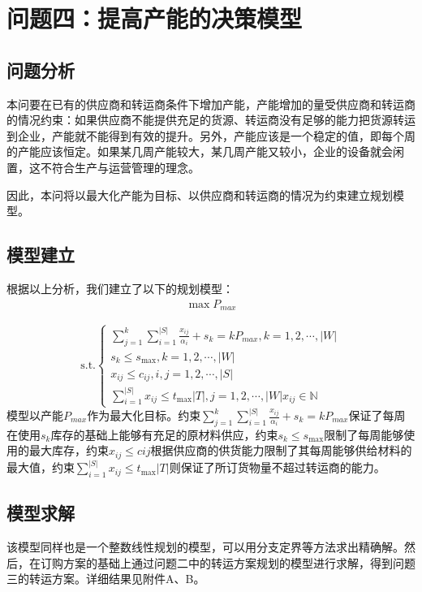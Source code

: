 \documentclass[withoutpreface,bwprint]{cumcmthesis} %
\begin{document}
\section{问题四：提高产能的决策模型}

\subsection{问题分析}

本问要在已有的供应商和转运商条件下增加产能，产能增加的量受供应商和转运商的情况约束：如果供应商不能提供充足的货源、转运商没有足够的能力把货源转运到企业，产能就不能得到有效的提升。另外，产能应该是一个稳定的值，即每个周的产能应该恒定。如果某几周产能较大，某几周产能又较小，企业的设备就会闲置，这不符合生产与运营管理的理念。

因此，本问将以最大化产能为目标、以供应商和转运商的情况为约束建立规划模型。

\subsection{模型建立}
根据以上分析，我们建立了以下的规划模型：
\begin{gather}
    \max P_{max}
\end{gather}

\begin{equation}
    \mathrm{s.t.}
    \begin{cases}
        \sum\limits_{j = 1}^{k}  \sum\limits_{i = 1}^{|S|} \frac{x_{ij}}{\alpha_i}+s_k=kP_{max}, k=1,2,\cdots,|W|\\
        s_k\leq s_{\mathrm{max}}, k=1,2,\cdots,|W|\\
        x_{ij}\leq c_{ij}, i,j = 1,2,\cdots,|S|\\
        \sum\limits_{i = 1}^{|S|} x_{ij} \leq t_{\mathrm{max}}|T|, j = 1,2,\cdots,|W|
        x_{ij} \in \mathbb{N}
    \end{cases}
\end{equation}
模型以产能$P_{max}$作为最大化目标。约束$\sum\limits_{j = 1}^{k}  \sum\limits_{i = 1}^{|S|} \frac{x_{ij}}{\alpha_i}+s_k=kP_{max}$保证了每周在使用$s_k$库存的基础上能够有充足的原材料供应，约束$s_k\leq s_{\mathrm{max}}$限制了每周能够使用的最大库存，约束$x_{ij}\leq c{ij}$根据供应商的供货能力限制了其每周能够供给材料的最大值，约束$\sum\limits_{i = 1}^{|S|} x_{ij} \leq t_{\mathrm{max}}|T|$则保证了所订货物量不超过转运商的能力。

\subsection{模型求解}%
该模型同样也是一个整数线性规划的模型，可以用分支定界等方法求出精确解。然后，在订购方案的基础上通过问题二中的转运方案规划的模型进行求解，得到问题三的转运方案。详细结果见附件A、B。
\end{document}
